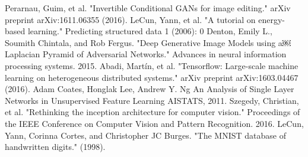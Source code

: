 \documentclass[9pt]{article}
\begin{document}
\noindent [13] Perarnau, Guim, et al. "Invertible Conditional GANs for image editing." arXiv preprint arXiv:1611.06355 (2016). \newline
\noindent [14] LeCun, Yann, et al. "A tutorial on energy-based learning." Predicting structured data 1 (2006): 0 \newline
\noindent [15] Denton, Emily L., Soumith Chintala, and Rob Fergus. "Deep Generative Image Models using a￼ Laplacian Pyramid of Adversarial Networks." Advances in neural information processing systems. 2015. \newline
\noindent [16] Abadi, Martín, et al. "Tensorflow: Large-scale machine learning on heterogeneous distributed systems." arXiv preprint arXiv:1603.04467 (2016). \newline
\noindent [17] Adam Coates, Honglak Lee, Andrew Y. Ng An Analysis of Single Layer Networks in Unsupervised Feature Learning AISTATS, 2011.
\noindent [18] Szegedy, Christian, et al. "Rethinking the inception architecture for computer vision." Proceedings of the IEEE Conference on Computer Vision and Pattern Recognition. 2016. \newline
\noindent [19] LeCun, Yann, Corinna Cortes, and Christopher JC Burges. "The MNIST database of handwritten digits." (1998). \newline



\appendix
\end{document}

